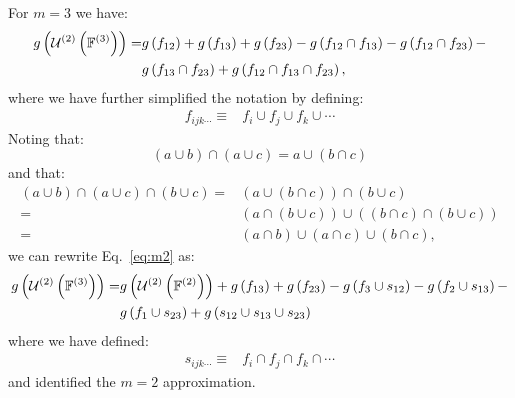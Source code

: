 \documentclass[11pt]{article}
\newcommand{\gxn}[1]{g\left(#1\right)}
\newcommand{\gapprox}[1]{g\left(#1\right)}
\begin{document}
For $m=3$ we have:
\begin{align}
	\gapprox{\unionset{2}{3}} =&
      \gxn{\Di} + \gxn{\Dj} + \gxn{\Dk} - \gxn{\IDiDj} -
	                 \gxn{\IDiDk} -\nonumber\\
	               & \gxn{\IDjDk} + \gxn{\IDiDjDk}\label{eq:m2},
\end{align}
where we have further simplified the notation by defining:
\begin{align}
	f_{ijk\cdots} \equiv& f_i\cup f_j\cup f_k \cup \cdots
\end{align}
Noting that:
\begin{equation}
    \left(a\cup b\right) \cap \left(a\cup c\right) = a\cup \left(b\cap c\right)
\end{equation}
and that:
\begin{align}
	\left(a\cup b\right)\cap\left(a\cup c\right)\cap\left(b\cup c\right) =&
	\left(a\cup\left(b\cap c\right)\right)\cap\left(b \cup c\right) \nonumber\\
	=&
	\left(a\cap\left(b\cup c\right)\right)\cup
	\left(\left(b\cap c\right)\cap\left(b\cup c\right)\right)\nonumber\\
		=&
	\left(a\cap b\right)\cup \left(a\cap c\right)\cup \left(b\cap c\right),
\end{align}
we can rewrite Eq.~\eqref{eq:m2} as:
\begin{align}
	\gapprox{\unionset{2}{3}} =& \gapprox{\unionset{2}{2}} + \gxn{\Dj} + \gxn{\Dk} -
	                 \gxn{f_3 \cup \Ii} -
	                 \gxn{f_2 \cup \Ij} -\nonumber\\
	               & \gxn{f_1 \cup \Ik} +
	                 \gxn{\Ii\cup \Ij\cup \Ik}
\end{align}
where we have defined:
\begin{align}
	s_{ijk\cdots} \equiv& f_i\cap f_j\cap f_k \cap \cdots
\end{align}
and identified the $m=2$ approximation.
\end{document}
